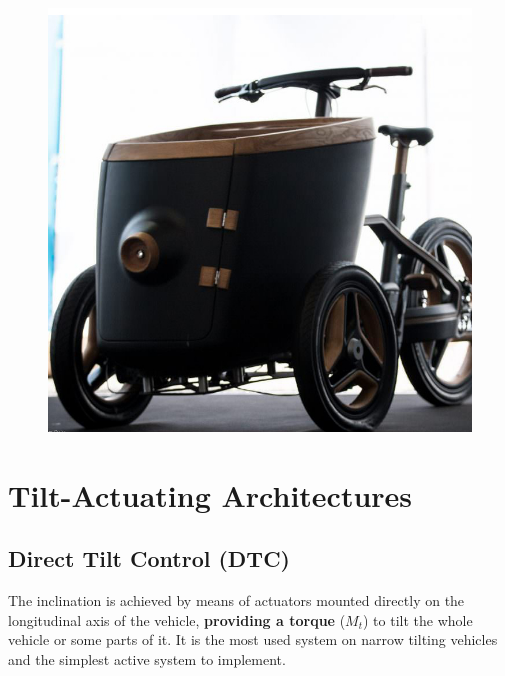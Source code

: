 \begin{figure}[!h]
		\endminipage\hfill
		  \includegraphics[width=1.0\linewidth]{figs/02/carqon}
		\endminipage
\end{figure}

\newpage

\section{Tilt-Actuating Architectures}
\subsection{Direct Tilt Control (DTC)}

The inclination is achieved by means of actuators mounted directly on the longitudinal axis of the vehicle, \textbf{providing a torque} ($M_t$) to tilt the whole vehicle or some parts of it. It is the most used system on narrow tilting vehicles and the simplest active system to implement.

